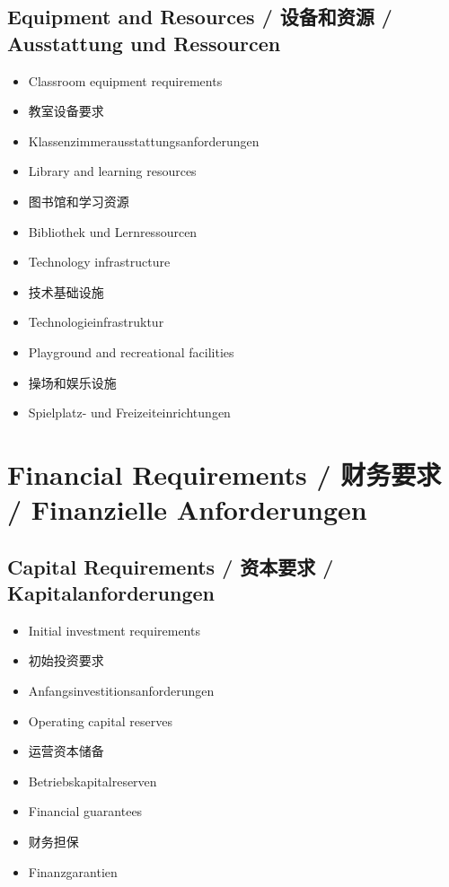 \subsection{Equipment and Resources / 设备和资源 / Ausstattung und Ressourcen}
\begin{itemize}
    \item Classroom equipment requirements
    \item 教室设备要求
    \item Klassenzimmerausstattungsanforderungen
    \item Library and learning resources
    \item 图书馆和学习资源
    \item Bibliothek und Lernressourcen
    \item Technology infrastructure
    \item 技术基础设施
    \item Technologieinfrastruktur
    \item Playground and recreational facilities
    \item 操场和娱乐设施
    \item Spielplatz- und Freizeiteinrichtungen
\end{itemize}

\section{Financial Requirements / 财务要求 / Finanzielle Anforderungen}

\subsection{Capital Requirements / 资本要求 / Kapitalanforderungen}
\begin{itemize}
    \item Initial investment requirements
    \item 初始投资要求
    \item Anfangsinvestitionsanforderungen
    \item Operating capital reserves
    \item 运营资本储备
    \item Betriebskapitalreserven
    \item Financial guarantees
    \item 财务担保
    \item Finanzgarantien
\end{itemize}

